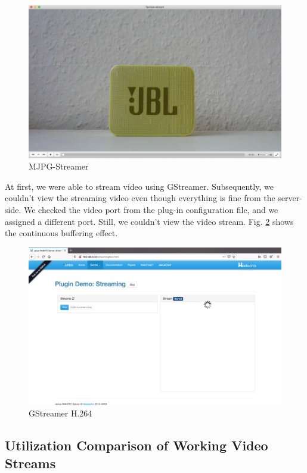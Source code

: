 \begin{figure}[H]
	\centering
	\includegraphics[width=.9\textwidth, trim=4 4 4 4,clip]{images/MJPG-Streamer.png}
	\caption{MJPG-Streamer}
	\label{fig:mjpg}
\end{figure}

At first, we were able to stream video using GStreamer. Subsequently, we couldn’t view the streaming video even though everything is fine from the server-side. We checked the video port from the plug-in configuration file, and we assigned a different port. Still, we couldn’t view the video stream. Fig. \ref{fig:gs} shows the continuous buffering effect. 

\begin{figure}[H]
	\centering
	\includegraphics[width=.9\textwidth, trim=4 4 4 4,clip]{images/GStreamer.png}
	\caption{GStreamer H.264}
	\label{fig:gs}
\end{figure}

\subsection{Utilization Comparison of Working Video Streams}

